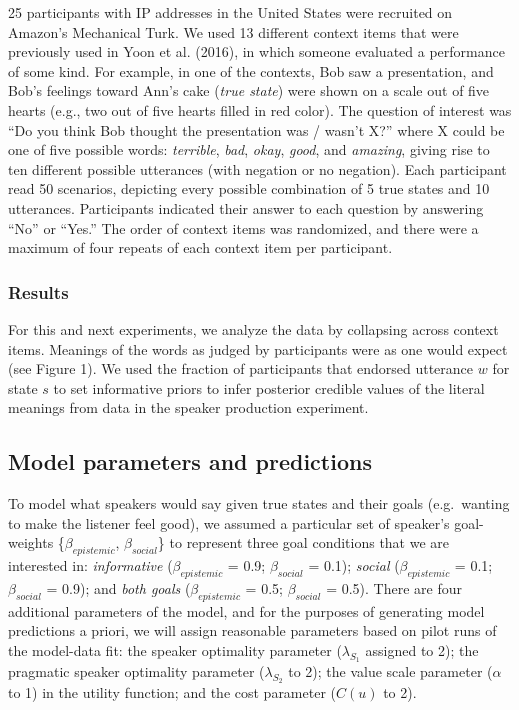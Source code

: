 \documentclass[10pt, letterpaper]{article}
\begin{document}
 25 participants with IP
addresses in the United States were recruited on Amazon's Mechanical
Turk. We used 13 different context items that were previously used in
Yoon et al. (2016), in which someone evaluated a performance of some
kind. For example, in one of the contexts, Bob saw a presentation, and
Bob's feelings toward Ann's cake (\emph{true state}) were shown on a
scale out of five hearts (e.g., two out of five hearts filled in red
color). The question of interest was ``Do you think Bob thought the
presentation was / wasn't X?'' where X could be one of five possible
words: \emph{terrible}, \emph{bad}, \emph{okay}, \emph{good}, and
\emph{amazing}, giving rise to ten different possible utterances (with
negation or no negation). Each participant read 50 scenarios, depicting
every possible combination of 5 true states and 10 utterances.
Participants indicated their answer to each question by answering ``No''
or ``Yes.'' The order of context items was randomized, and there were a
maximum of four repeats of each context item per participant.

\subsubsection{Results}\label{results}

For this and next experiments, we analyze the data by collapsing across
context items. Meanings of the words as judged by participants were as
one would expect (see Figure 1). We used the fraction of participants
that endorsed utterance \(w\) for state \(s\) to set informative priors
to infer posterior credible values of the literal meanings from data in
the speaker production experiment.

\subsection{Model parameters and
predictions}\label{model-parameters-and-predictions}

To model what speakers would say given true states and their goals
(e.g.~wanting to make the listener feel good), we assumed a particular
set of speaker's goal-weights \{\(\beta_{epistemic}\),
\(\beta_{social}\)\} to represent three goal conditions that we are
interested in: \emph{informative} (\(\beta_{epistemic}\) = 0.9;
\(\beta_{social}\) = 0.1); \emph{social} (\(\beta_{epistemic}\) = 0.1;
\(\beta_{social}\) = 0.9); and \emph{both goals} (\(\beta_{epistemic}\)
= 0.5; \(\beta_{social}\) = 0.5). There are four additional parameters
of the model, and for the purposes of generating model predictions a
priori, we will assign reasonable parameters based on pilot runs of the
model-data fit: the speaker optimality parameter (\(\lambda_{S_1}\)
assigned to 2); the pragmatic speaker optimality parameter
(\(\lambda_{S_2}\) to 2); the value scale parameter (\(\alpha\) to 1) in
the utility function; and the cost parameter (\(C(u)\) to 2).
\end{document}
